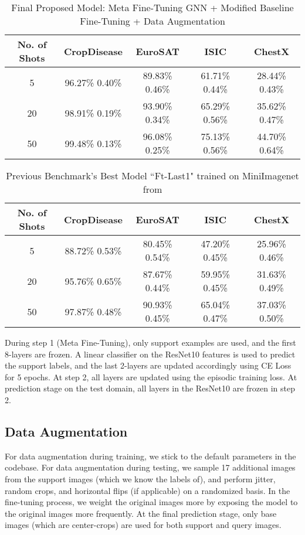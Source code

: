 \documentclass[10pt,twocolumn,letterpaper]{article}
\newcommand{\dtoprule}{\specialrule{1pt}{0pt}{0.4pt}\specialrule{0.3pt}{0pt}{\belowrulesep}}
\begin{document}
\begin{table*}[t]
  \centering
  \begin{tabular}{@{}ccccc@{}}
    \dtoprule
    No. of Shots  & CropDisease    & EuroSAT & ISIC & ChestX  \\
    \midrule
    
    5 & 96.27\%  0.40\% &	89.83\%  0.46\% &	61.71\%  0.44\% &	28.44\%  0.43\% \\ 
    20 & 98.91\%  0.19\%	& 93.90\%  0.34\%	& 65.29\%  0.56\%	& 35.62\%  0.47\% \\ 
    50 & 99.48\%  0.13\%	& 96.08\%  0.25\% & 75.13\%  0.56\% &	44.70\%  0.64\% \\ 
    \bottomrule
  \end{tabular}
  
  \caption{Final Proposed Model: Meta Fine-Tuning GNN + Modified Baseline Fine-Tuning + Data Augmentation}
\end{table*}


\begin{table*}[t]
  \centering
  \begin{tabular}{@{}ccccc@{}}
    \dtoprule
    No. of Shots  & CropDisease    & EuroSAT & ISIC & ChestX  \\
    \midrule
    5 & 88.72\%  0.53\% &	80.45\%  0.54\% &	47.20\%  0.45\% & 25.96\%  0.46\%	 \\ 
    20 & 95.76\%  0.65\%	& 87.67\%  0.44\%	& 59.95\%  0.45\%	& 31.63\%  0.49\% \\ 
    50 & 97.87\%  0.48\%	& 90.93\%  0.45\% & 65.04\%  0.47\% &	37.03\%  0.50\% \\ 
    \bottomrule
  \end{tabular}
  
  \caption{Previous Benchmark's Best Model ``Ft-Last1" trained on MiniImagenet from \cite{guo2019new}}
\end{table*}


During step 1 (Meta Fine-Tuning), only support examples are used, and the first 8-layers are frozen. A linear classifier on the ResNet10 features is used to predict the support labels, and the last 2-layers are updated accordingly using CE Loss for 5 epochs. At step 2, all layers are updated using the episodic training loss.  At prediction stage on the test domain, all layers in the ResNet10 are frozen in step 2. 


\subsection{Data Augmentation}
For data augmentation during training, we stick to the default parameters in the codebase. For data augmentation during testing, we sample 17 additional images from the support images (which we know the labels of), and perform jitter, random crops, and horizontal flips (if applicable) on a randomized basis. In the fine-tuning process, we weight the original images more by exposing the model to the original images more frequently. At the final prediction stage, only base images (which are center-crops) are used for both support and query images. 
\end{document}
